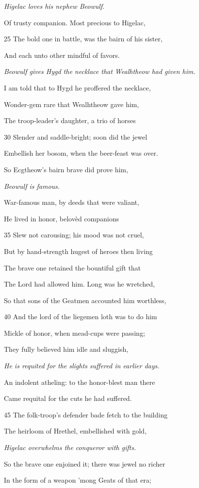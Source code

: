 \emph{Higelac loves his
nephew Beowulf.}

Of trusty companion. Most precious to Higelac,

25
The bold one in battle, was the bairn of his sister,

And each unto other mindful of favors.

\emph{Beowulf gives
Hygd the necklace
that Wealhtheow
had given him.}

I am told that to Hygd he proffered the necklace,

Wonder-gem rare that Wealhtheow gave him,

The troop-leader’s daughter, a trio of horses

30
Slender and saddle-bright; soon did the jewel

Embellish her bosom, when the beer-feast was over.

So Ecgtheow’s bairn brave did prove him,

\emph{Beowulf is famous.}

War-famous man, by deeds that were valiant,

He lived in honor, belovèd companions

35
Slew not carousing; his mood was not cruel,

But by hand-strength hugest of heroes then living

The brave one retained the bountiful gift that

The Lord had allowed him. Long was he wretched,

So that sons of the Geatmen accounted him worthless,

40
And the lord of the liegemen loth was to do him

Mickle of honor, when mead-cups were passing;

They fully believed him idle and sluggish,

\emph{He is requited for
the slights suffered
in earlier days.}

An indolent atheling: to the honor-blest man there

Came requital for the cuts he had suffered.

45
The folk-troop’s defender bade fetch to the building

The heirloom of Hrethel, embellished with gold,

\emph{Higelac overwhelms
the conqueror
with gifts.}

So the brave one enjoined it; there was jewel no richer

In the form of a weapon ’mong Geats of that era;

